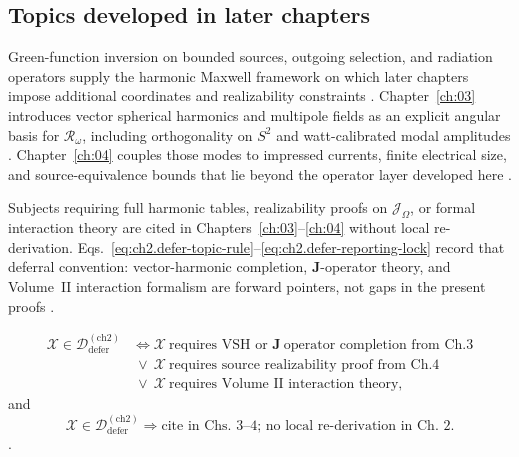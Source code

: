 \subsection{Topics developed in later chapters}
\label{sec:ch02112}

Green-function inversion on bounded sources, outgoing selection, and radiation operators supply the
harmonic Maxwell framework on which later chapters impose additional coordinates and realizability
constraints \cite{stratton1941,harrington2001}. Chapter~\ref{ch:03} introduces vector spherical
harmonics and multipole fields as an explicit angular basis for $\mathcal{R}_\omega$, including
orthogonality on $S^2$ and watt-calibrated modal amplitudes \cite{stratton1941,hansen1988}.
Chapter~\ref{ch:04} couples those modes to impressed currents, finite electrical size, and
source-equivalence bounds that lie beyond the operator layer developed here \cite{harrington2001}.

Subjects requiring full harmonic tables, realizability proofs on $\mathcal{J}_\Omega$, or formal
interaction theory are cited in Chapters~\ref{ch:03}--\ref{ch:04} without local re-derivation.
Eqs.~\eqref{eq:ch2.defer-topic-rule}--\eqref{eq:ch2.defer-reporting-lock} record that deferral
convention: vector-harmonic completion, $\mathbf{J}$-operator theory, and Volume~II interaction
formalism are forward pointers, not gaps in the present proofs \cite{stratton1941}.
\medskip

\begin{equation}
\label{eq:ch2.defer-topic-rule}
\begin{aligned}
\mathcal{X}\in\mathcal{D}_{\mathrm{defer}}^{(\mathrm{ch2})}
&\iff
\mathcal{X}\ \text{requires VSH or }\mathbf{J}\ \text{operator completion from Ch.3} \\
&\ \vee\ \mathcal{X}\ \text{requires source realizability proof from Ch.4} \\
&\ \vee\ \mathcal{X}\ \text{requires Volume II interaction theory},
\end{aligned}
\end{equation}
and
\begin{equation}
\label{eq:ch2.defer-reporting-lock}
\mathcal{X}\in\mathcal{D}_{\mathrm{defer}}^{(\mathrm{ch2})}
\Longrightarrow
\text{cite in Chs.~3--4; no local re-derivation in Ch.~2}.
\end{equation}
\cite{stratton1941}.